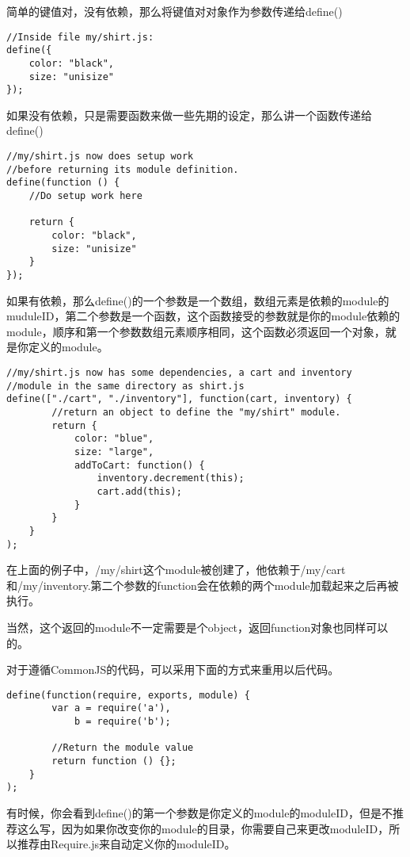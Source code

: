简单的键值对，没有依赖，那么将键值对对象作为参数传递给define()

\begin{lstlisting}
//Inside file my/shirt.js:
define({
    color: "black",
    size: "unisize"
});
\end{lstlisting}

    如果没有依赖，只是需要函数来做一些先期的设定，那么讲一个函数传递给define()
    \begin{lstlisting}
//my/shirt.js now does setup work
//before returning its module definition.
define(function () {
    //Do setup work here

    return {
        color: "black",
        size: "unisize"
    }
});
    \end{lstlisting}

    如果有依赖，那么define()的一个参数是一个数组，数组元素是依赖的module的muduleID，第二个参数是一个函数，这个函数接受的参数就是你的module依赖的module，顺序和第一个参数数组元素顺序相同，这个函数必须返回一个对象，就是你定义的module。

    \begin{lstlisting}
//my/shirt.js now has some dependencies, a cart and inventory
//module in the same directory as shirt.js
define(["./cart", "./inventory"], function(cart, inventory) {
        //return an object to define the "my/shirt" module.
        return {
            color: "blue",
            size: "large",
            addToCart: function() {
                inventory.decrement(this);
                cart.add(this);
            }
        }
    }
);
    \end{lstlisting}

    在上面的例子中，/my/shirt这个module被创建了，他依赖于/my/cart和/my/inventory.第二个参数的function会在依赖的两个module加载起来之后再被执行。

    当然，这个返回的module不一定需要是个object，返回function对象也同样可以的。

    对于遵循CommonJS的代码，可以采用下面的方式来重用以后代码。

    \begin{lstlisting}
define(function(require, exports, module) {
        var a = require('a'),
            b = require('b');

        //Return the module value
        return function () {};
    }
);
    \end{lstlisting}

    有时候，你会看到define()的第一个参数是你定义的module的moduleID，但是不推荐这么写，因为如果你改变你的module的目录，你需要自己来更改moduleID，所以推荐由Require.js来自动定义你的moduleID。

